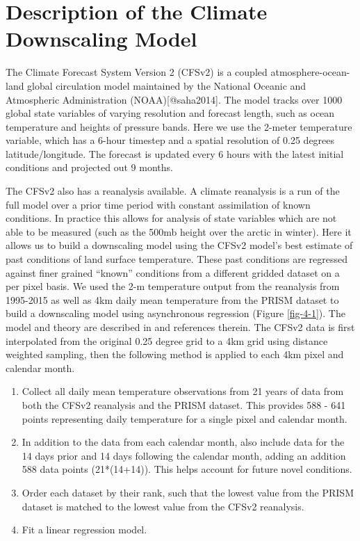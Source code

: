 \section{Description of the Climate Downscaling Model}

The Climate Forecast System Version 2 (CFSv2) is a coupled atmosphere-ocean-land global circulation model maintained by the National Oceanic and Atmospheric Administration (NOAA)[@saha2014]. The model tracks over 1000 global state variables of varying resolution and forecast length, such as ocean temperature and heights of pressure bands. Here we use the 2-meter temperature variable, which has a 6-hour timestep and a spatial resolution of 0.25 degrees latitude/longitude. The forecast is updated every 6 hours with the latest initial conditions and projected out 9 months. 

The CFSv2 also has a reanalysis available. A climate reanalysis is a run of the full model over a prior time period with constant assimilation of known conditions. In practice this allows for analysis of state variables which are not able to be measured (such as the 500mb height over the arctic in winter). Here it allows us to build a downscaling model using the CFSv2 model’s best estimate of past conditions of land surface temperature. These past conditions are regressed against finer grained “known” conditions from a different gridded dataset on a per pixel basis. We used the 2-m temperature output from the reanalysis from 1995-2015 as well as 4km daily mean temperature from the PRISM dataset \citep{prismdata} to build a downscaling model using asynchronous regression (Figure \ref{fig-4-1}). The model and theory are described in \cite{stoner2013} and references therein. The CFSv2 data is first interpolated from the original 0.25 degree grid to a 4km grid using distance weighted sampling, then the following method is applied to each 4km pixel and calendar month.

\begin{enumerate}
    \item Collect all daily mean temperature observations from 21 years of data from both the CFSv2 reanalysis and the PRISM dataset. This provides 588 - 641 points representing daily temperature for a single pixel and calendar month.
    \item In addition to the data from each calendar month, also include data for the 14 days prior and 14 days following the calendar month, adding an addition 588 data points (21*(14+14)). This helps account for future novel conditions.
    \item Order each dataset by their rank, such that the lowest value from the PRISM dataset is matched to the lowest value from the CFSv2 reanalysis.
    \item Fit a linear regression model.
\end{enumerate}

